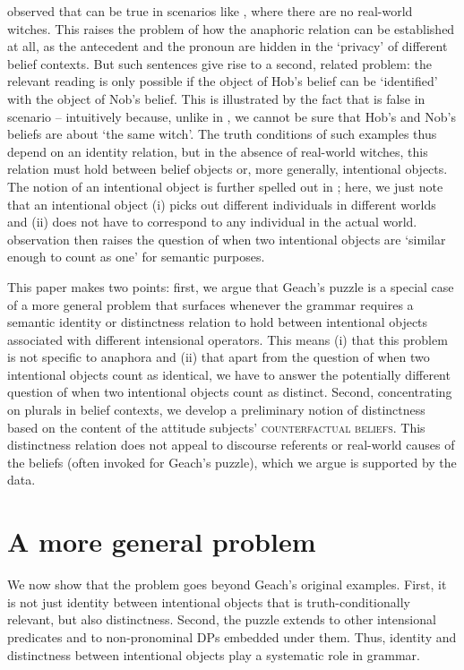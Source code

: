 \documentclass[output=paper]{langscibook}
\begin{document}
\noindent \citet{Geach:1967} observed that  can be true in scenarios like , where there are no real-world witches. This raises the problem of how the anaphoric relation can be established at all, as the antecedent and the pronoun are hidden in the `privacy' of different belief contexts. But such sentences give rise to a second, related problem: the relevant reading is only possible if the object of Hob's belief can be `identified' with the object of Nob's belief. This is illustrated by the fact that  is false in scenario   -- intuitively because, unlike in , we cannot be sure that Hob's and Nob's beliefs are about `the same witch'. The truth conditions of such examples thus depend on an identity relation, but in the absence of real-world witches, this relation must hold between belief objects or, more generally, intentional objects. The notion of an intentional object is further spelled out in ; here, we just note that an intentional object (i) picks out different individuals in different worlds and (ii) does not have to correspond to any individual in the actual world.  observation then raises the question of when two intentional objects are `similar enough to count as one' for semantic purposes.

This paper makes two points: first, we argue that Geach's puzzle is a special case of a more general problem that surfaces whenever the grammar requires a semantic identity or distinctness relation to hold between intentional objects associated with different intensional operators. This means (i) that this problem is not specific to anaphora and (ii) that apart from the question of when two intentional objects count as identical, we have to answer the potentially different question of when two intentional objects count as distinct. Second, concentrating on plurals in belief contexts, we develop a preliminary notion of distinctness based on the content of the attitude subjects' \textsc{counterfactual beliefs}. This distinctness relation does not appeal to discourse referents or real-world causes of the beliefs (often invoked for Geach's puzzle), which we argue is supported by the data.


\section{A more general problem}

We now show that the problem goes beyond Geach's original examples. First, it is not just identity between intentional objects that is truth-conditionally relevant, but also distinctness. Second, the puzzle extends to other intensional predicates and to non-pronominal DPs embedded under them. Thus, identity and distinctness between intentional objects play a systematic role in grammar.
\end{document}

